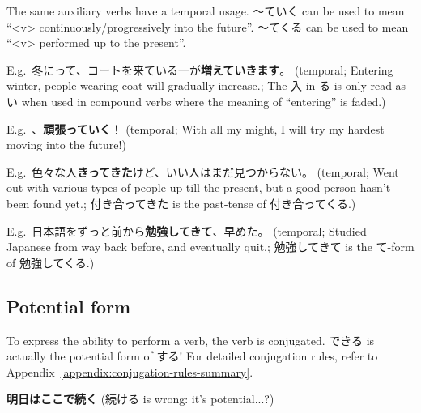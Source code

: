 \documentclass[../nihongo-gakushuu-kyouzai.tex]{subfiles}
\begin{document}
The same auxiliary verbs have a temporal usage. 〜ていく can be used to mean ``<v> continuously/progressively into the future''. 〜てくる can be used to mean ``<v> performed up to the present''.

E.g.\ 冬にって、コートを来ている一が\textbf{増えていきます}。 (temporal; Entering winter, people wearing coat will gradually increase.; The 入 in る is only read as い when used in compound verbs where the meaning of ``entering'' is faded.)

E.g.\ 、\textbf{頑張っていく}！ (temporal; With all my might, I will try my hardest moving into the future!)

E.g.\ 色々な人\textbf{きってきた}けど、いい人はまだ見つからない。 (temporal; Went out with various types of people up till the present, but a good person hasn't been found yet.; 付き合ってきた is the past-tense of 付き合ってくる.)

E.g.\ 日本語をずっと前から\textbf{勉強してきて}、早めた。 (temporal; Studied Japanese from way back before, and eventually quit.; 勉強してきて is the て-form of 勉強してくる.)

\subsection{Potential form}
To express the ability to perform a verb, the verb is conjugated. できる is actually the potential form of する! For detailed conjugation rules, refer to Appendix~\ref{appendix:conjugation-rules-summary}.

\textbf{明日はここで続く} (続ける is wrong: it's potential...?)  %
\end{document}
